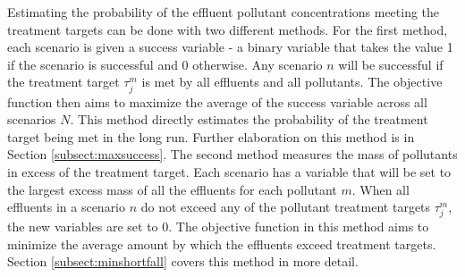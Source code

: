 \documentclass[preprint,12pt,authoryear]{elsarticle}
\begin{document}
Estimating the probability of the effluent pollutant concentrations meeting the treatment targets can be done with two different methods. For the first method, each scenario is given a success variable  - a binary variable that takes the value 1 if the scenario is successful and 0 otherwise. Any scenario $n$ will be successful if the treatment target $\tau_j^m$ is met by all effluents and all pollutants. The objective function then aims to maximize the average of the success variable across all scenarios $N$. This method directly estimates the probability of the treatment target being met in the long run. Further elaboration on this method is in Section \ref{subsect:maxsuccess}. The second method measures the mass of pollutants in excess of the treatment target. Each scenario has a variable that will be set to the largest excess mass of all the effluents for each pollutant $m$. When all effluents in a scenario $n$ do not exceed any of the pollutant treatment targets $\tau_j^m$, the new variables are set to 0. The objective function in this method aims to minimize the average amount by which the effluents exceed treatment targets. Section \ref{subsect:minshortfall} covers this method in more detail.
\end{document}
